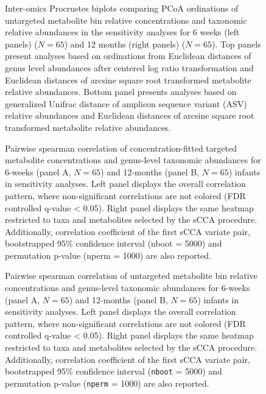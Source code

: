 \begin{figure}[!h]
    \centering
    \caption[Inter-omics Procrustes biplots comparing PCoA ordinations of untargeted metabolite bin relative concentrations and taxonomic relative abundances in the sensitivity analyses for 6 weeks (left panels) ($N = 65$) and 12 months (right panels) ($N = 65$)]{Inter-omics Procrustes biplots comparing PCoA ordinations of untargeted metabolite bin relative concentrations and taxonomic relative abundances in the sensitivity analyses for 6 weeks (left panels) ($N = 65$) and 12 months (right panels) ($N = 65$). Top panels present analyses based on ordinations from Euclidean distances of genus level abundances after centered log ratio transformation and Euclidean distances of arcsine square root transformed metabolite relative abundances. Bottom panel presents analyses based on generalized Unifrac distance of amplicon sequence variant (ASV) relative abundances and Euclidean distances of arcsine square root transformed metabolite relative abundances.}
    \label{fig:b6}
\end{figure}

\begin{figure}[!h]
    \centering
    \caption[Pairwise spearman correlation of concentration-fitted targeted metabolite concentrations and genus-level taxonomic abundances for 6-weeks (panel A, $N = 65$) and 12-months (panel B, $N = 65$) infants in sensitivity analyses]{Pairwise spearman correlation of concentration-fitted targeted metabolite concentrations and genus-level taxonomic abundances for 6-weeks (panel A, $N = 65$) and 12-months (panel B, $N = 65$) infants in sensitivity analyses. Left panel displays the overall correlation pattern, where non-significant correlations are not colored (FDR controlled q-value < 0.05). Right panel displays the same heatmap restricted to taxa and metabolites selected by the sCCA procedure. Additionally, correlation coefficient of the first sCCA variate pair, bootstrapped 95\% confidence interval (nboot = 5000) and permutation p-value (nperm = 1000) are also reported.}
    \label{fig:b7}
\end{figure}

\begin{figure}[!h]
    \centering
    \caption[Pairwise spearman correlation of untargeted metabolite bin relative concentrations and genus-level taxonomic abundances for 6-weeks (panel A, $N = 65$) and 12-months (panel B, $N = 65$) infants in sensitivity analyses]{Pairwise spearman correlation of untargeted metabolite bin relative concentrations and genus-level taxonomic abundances for 6-weeks (panel A, $N = 65$) and 12-months (panel B, $N = 65$) infants in sensitivity analyses. Left panel displays the overall correlation pattern, where non-significant correlations are not colored (FDR controlled q-value < 0.05). Right panel displays the same heatmap restricted to taxa and metabolites selected by the sCCA procedure. Additionally, correlation coefficient of the first sCCA variate pair, bootstrapped 95\% confidence interval (\texttt{nboot} = 5000) and permutation p-value (\texttt{nperm} = 1000) are also reported.}
    \label{fig:b8}
\end{figure}


